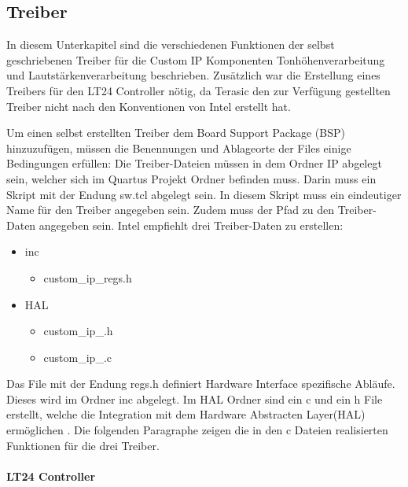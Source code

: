 \subsection{Treiber}\label{subsec:drivers}
In diesem Unterkapitel sind die verschiedenen Funktionen der selbst geschriebenen Treiber für die Custom IP Komponenten Tonhöhenverarbeitung und Lautstärkenverarbeitung beschrieben. Zusätzlich war die Erstellung eines Treibers für den LT24 Controller nötig, da Terasic den zur Verfügung gestellten Treiber nicht nach den Konventionen von Intel erstellt hat.

Um einen selbst erstellten Treiber dem Board Support Package (BSP) hinzuzufügen, müssen die Benennungen und Ablageorte der Files einige Bedingungen erfüllen:  
Die Treiber-Dateien müssen in dem Ordner IP abgelegt sein, welcher sich im Quartus Projekt Ordner befinden muss. Darin muss ein Skript mit der Endung sw.tcl abgelegt sein. In diesem Skript muss ein eindeutiger Name für den Treiber angegeben sein. Zudem muss der Pfad zu den Treiber-Daten angegeben sein. Intel empfiehlt drei Treiber-Daten zu erstellen:
  \renewcommand{\labelitemi}{$\blacksquare$}
 \renewcommand\labelitemii{$\square$}
 \begin{itemize}
 	\item  inc
 	\begin{itemize}
 		\item  custom\_ip\_regs.h
 	\end{itemize}
 \end{itemize}
 \begin{itemize}
	\item  HAL
	\begin{itemize}
		\item  custom\_ip\_.h
		\item  custom\_ip\_.c
	\end{itemize}
\end{itemize}

Das File mit der Endung regs.h definiert Hardware Interface spezifische Abläufe. Dieses wird im Ordner inc abgelegt. Im HAL Ordner sind ein c und ein h File erstellt, welche die Integration mit dem Hardware Abstracten Layer(HAL) ermöglichen \cite{NIOS_II_soft}.
Die folgenden Paragraphe zeigen die in den c Dateien realisierten Funktionen für die drei Treiber.

\paragraph{LT24 Controller}\mbox{}\\

